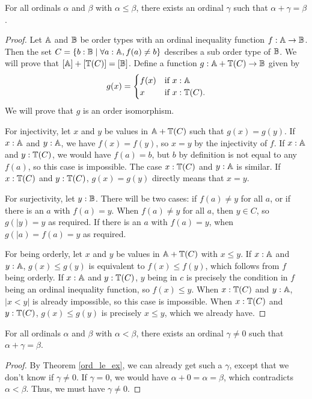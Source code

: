 \documentclass[../../math.tex]{subfiles}
\begin{document}
\begin{theorem} \label{ord_le_ex}
    For all ordinals $\alpha$ and $\beta$ with $\alpha \leq \beta$, there exists
    an ordinal $\gamma$ such that $\alpha + \gamma = \beta$.
\end{theorem}
\begin{proof}
    Let $\mathbb{A}$ and $\mathbb{B}$ be order types with an ordinal inequality function $f : \mathbb{A}
    \to \mathbb{B}$.  Then the set $C = \{b : \mathbb{B} \mid \forall a : \mathbb{A}, f(a) \neq b\}$
    describes a sub order type of $\mathbb{B}$.  We will prove that $[\mathbb{A}] + [\mathbb{T}(C)] =
    [\mathbb{B}]$.  Define a function $g : \mathbb{A} + \mathbb{T}(C) \to \mathbb{B}$ given by
    \[
        g(x) =
        \begin{cases}
            f(x) &\text{if $x : \mathbb{A}$} \\
            x    &\text{if $x : \mathbb{T}(C)$.}
        \end{cases}
    \]
    We will prove that $g$ is an order isomorphism.

    For injectivity, let $x$ and $y$ be values in $\mathbb{A} + \mathbb{T}(C)$ such that $g(x) =
    g(y)$.  If $x : \mathbb{A}$ and $y : \mathbb{A}$, we have $f(x) = f(y)$, so $x = y$ by the
    injectivity of $f$.  If $x : \mathbb{A}$ and $y : \mathbb{T}(C)$, we would have $f(a) = b$,
    but $b$ by definition is not equal to any $f(a)$, so this case is
    impossible.  The case $x : \mathbb{T}(C)$ and $y : \mathbb{A}$ is similar.  If $x : \mathbb{T}(C)$
    and $y : \mathbb{T}(C)$, $g(x) = g(y)$ directly means that $x = y$.

    For surjectivity, let $y : \mathbb{B}$.  There will be two cases: if $f(a) \neq y$
    for all $a$, or if there is an $a$ with $f(a) = y$.  When $f(a) \neq y$ for
    all $a$, then $y \in C$, so $g(|y) = y$ as required.  If there is an $a$ with
    $f(a) = y$, when $g(|a) = f(a) = y$ as required.

    For being orderly, let $x$ and $y$ be values in $\mathbb{A} + \mathbb{T}(C)$ with $x \leq
    y$.  If $x : \mathbb{A}$ and $y : \mathbb{A}$, $g(x) \leq g(y)$ is equivalent to $f(x) \leq
    f(y)$, which follows from $f$ being orderly.  If $x : \mathbb{A}$ and $y : \mathbb{T}(C)$,
    $y$ being in $c$ is precisely the condition in $f$ being an ordinal
    inequality function, so $f(x) \leq y$.  When $x : \mathbb{T}(C)$ and $y : \mathbb{A}$, $|x <
    y|$ is already impossible, so this case is impossible.  When $x : \mathbb{T}(C)$ and
    $y : \mathbb{T}(C)$, $g(x) \leq g(y)$ is precisely $x \leq y$, which we already
    have.
\end{proof}

\begin{theorem} \label{ord_lt_ex}
    For all ordinals $\alpha$ and $\beta$ with $\alpha < \beta$, there exists
    an ordinal $\gamma \neq 0$ such that $\alpha + \gamma = \beta$.
\end{theorem}
\begin{proof}
    By Theorem \ref{ord_le_ex}, we can already get such a $\gamma$, except that
    we don't know if $\gamma \neq 0$.  If $\gamma = 0$, we would have $\alpha +
    0 = \alpha = \beta$, which contradicts $\alpha < \beta$.  Thus, we must have
    $\gamma \neq 0$.
\end{proof}
\end{document}
